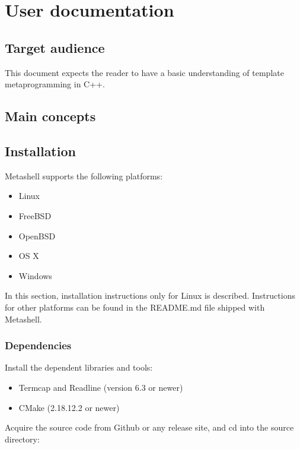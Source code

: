 

\chapter{User documentation}

\section{Target audience}

This document expects the reader to have a basic understanding of template
metaprogramming in C++.


\section{Main concepts}


\section{Installation}

Metashell supports the following platforms:
\begin{itemize}
    \item Linux
    \item FreeBSD
    \item OpenBSD
    \item OS X
    \item Windows
\end{itemize}

In this section, installation instructions only for Linux is described.
Instructions for other platforms can be found in the README.md file shipped
with Metashell.

\subsection{Dependencies}

Install the dependent libraries and tools:

\begin{itemize}
    \item Termcap and Readline (version 6.3 or newer)
    \item CMake (2.18.12.2 or newer)
\end{itemize}

Acquire the source code from Github\cite{github} or any release site, and cd
into the source directory:

